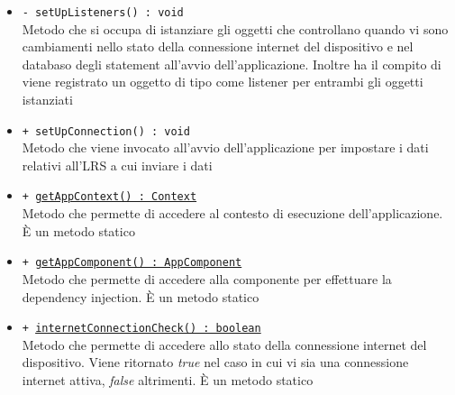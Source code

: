 \documentclass[../Tesi.tex]{subfiles}
\begin{document}
\begin{description}
\begin{itemize}
				\item \texttt{- setUpListeners() : void}\\
				Metodo che si occupa di istanziare gli oggetti che controllano quando vi sono cambiamenti nello stato della connessione internet del dispositivo e nel databaso degli statement all'avvio dell'applicazione. Inoltre ha il compito di viene registrato un oggetto di tipo  come listener per entrambi gli oggetti istanziati

				\item \texttt{+ setUpConnection() : void}\\
				Metodo che viene invocato all'avvio dell'applicazione per impostare i dati relativi all'LRS a cui inviare i dati

				\item \texttt{+ \underline{getAppContext() : Context}}\\
				Metodo che permette di accedere al contesto di esecuzione dell'applicazione. È un metodo statico

				\item \texttt{+ \underline{getAppComponent() : AppComponent}}\\
				Metodo che permette di accedere alla componente per effettuare la dependency injection. È un metodo statico

				\item \texttt{+ \underline{internetConnectionCheck() : boolean}}\\
				Metodo che permette di accedere allo stato della connessione internet del dispositivo. Viene ritornato \textit{true} nel caso in cui vi sia una connessione internet attiva, \textit{false} altrimenti. È un metodo statico
			\end{itemize}
		\end{description}
\end{document}
